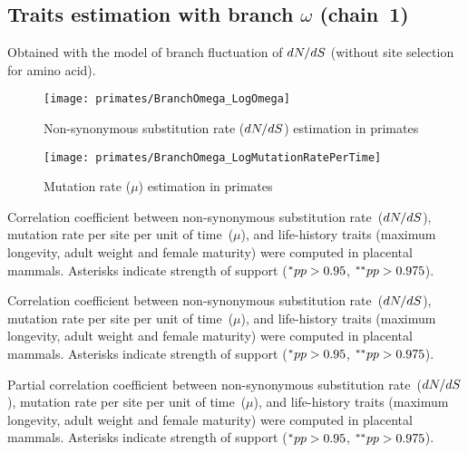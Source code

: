 \subsection{Traits estimation with branch \texorpdfstring{$\omega$}{ω} (chain~1)}
Obtained with the model of branch fluctuation of $\dnds$ (without site selection for amino acid).

\begin{figure}[H]
    \centering
    \texttt{[image: primates/BranchOmega\_LogOmega]}
    \caption[$\dnds$ estimation in primates]{{Non-synonymous substitution} rate ($\dnds$) estimation in primates}
\end{figure}

\begin{figure}[H]
    \centering
    \texttt{[image: primates/BranchOmega\_LogMutationRatePerTime]}
    \caption[$\mu$ estimation in primates]{Mutation rate ($\mu$) estimation in primates}
\end{figure}

\begin{table}[H]
    
    \caption[Correlation coefficient matrix in primates ($\dnds$)]{
    Correlation coefficient between non-synonymous substitution rate~($\dnds$), mutation rate per site per unit of time~($\mu$), and life-history traits (maximum longevity, adult weight and female maturity) were computed in placental mammals.
    Asterisks indicate strength of support ($\smash{^{*}} pp > 0.95$, $\smash{^{**}} pp > 0.975$).}
\end{table}

\begin{table}[H]
    
    \caption[Covariance matrix in primates ($\dnds$)]{
    Correlation coefficient between non-synonymous substitution rate~($\dnds$), mutation rate per site per unit of time~($\mu$), and life-history traits (maximum longevity, adult weight and female maturity) were computed in placental mammals.
    Asterisks indicate strength of support ($\smash{^{*}} pp > 0.95$, $\smash{^{**}} pp > 0.975$).}
\end{table}

\begin{table}[H]
    
    \caption[Partial correlation coefficient matrix in primates ($\dnds$)]{
    Partial correlation coefficient between non-synonymous substitution rate~($\dnds$), mutation rate per site per unit of time~($\mu$), and life-history traits (maximum longevity, adult weight and female maturity) were computed in placental mammals.
    Asterisks indicate strength of support ($\smash{^{*}} pp > 0.95$, $\smash{^{**}} pp > 0.975$).}
\end{table}


